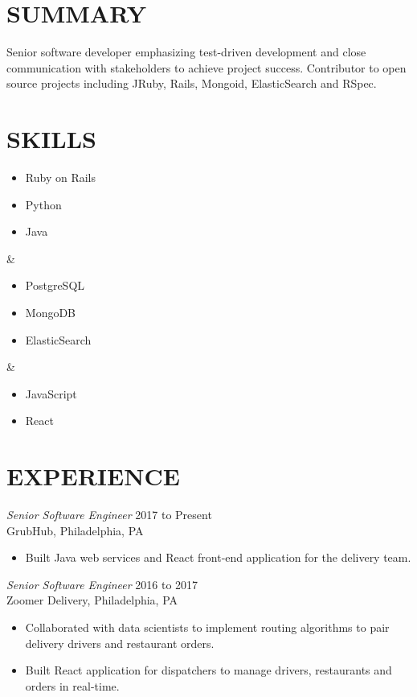 \documentclass[line]{res}
\begin{document}
\newsectionwidth{0in}

\address{michaelcdalton@gmail.com / (267) 247-2541}
\address{github.com/kcdragon / linkedin.com/in/michaelcdalton}

\begin{resume}
\section{SUMMARY}
Senior software developer emphasizing test-driven development and close communication with stakeholders to achieve project success. Contributor to open source projects including JRuby, Rails, Mongoid, ElasticSearch and RSpec.

\section{SKILLS}
\begin{ncolumn}{3}
\begin{itemize} \itemsep -2pt
\item Ruby on Rails
\item Python
\item Java
\end{itemize}
&
\begin{itemize} \itemsep -2pt
\item PostgreSQL
\item MongoDB
\item ElasticSearch
\end{itemize}
&
\begin{itemize} \itemsep -2pt
\item JavaScript
\item React
\end{itemize}
\end{ncolumn}

\section{EXPERIENCE}

{\sl Senior Software Engineer} \hfill 2017 to Present \\
GrubHub, Philadelphia, PA
\begin{itemize} \itemsep -2pt
\item Built Java web services and React front-end application for the delivery team.
\end{itemize}

{\sl Senior Software Engineer} \hfill 2016 to 2017 \\
Zoomer Delivery, Philadelphia, PA
\begin{itemize} \itemsep -2pt
\item Collaborated with data scientists to implement routing algorithms to pair delivery drivers and restaurant orders.
\item Built React application for dispatchers to manage drivers, restaurants and orders in real-time.
\end{itemize}


\end{resume}
\end{document}
